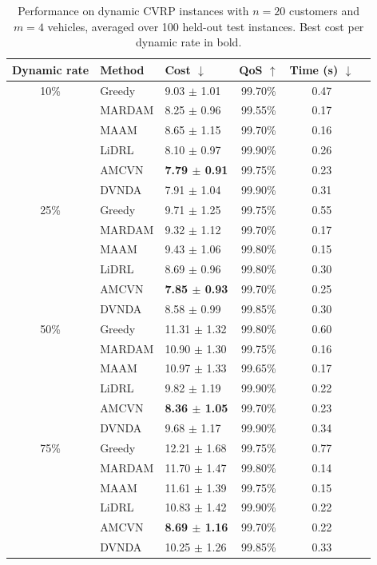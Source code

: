 \begin{table}[t]
\centering
\caption{Performance on dynamic CVRP instances with $n=20$ customers and $m=4$ vehicles, averaged over 100 held-out test instances. Best cost per dynamic rate in bold.}
\label{tab:main_results_n20}
\begin{tabular}{cllccc}
\toprule
Dynamic rate & Method & Cost $\downarrow$ & QoS $\uparrow$ & Time (s) $\downarrow$ \\
\midrule
10\% & Greedy & 9.03 $\pm$ 1.01 & 99.70\% & 0.47 \\
 & MARDAM & 8.25 $\pm$ 0.96 & 99.55\% & 0.17 \\
 & MAAM & 8.65 $\pm$ 1.15 & 99.70\% & 0.16 \\
 & LiDRL & 8.10 $\pm$ 0.97 & 99.90\% & 0.26 \\
 & AMCVN & \textbf{7.79 $\pm$ 0.91} & 99.75\% & 0.23 \\
 & DVNDA & 7.91 $\pm$ 1.04 & 99.90\% & 0.31 \\
\midrule
25\% & Greedy & 9.71 $\pm$ 1.25 & 99.75\% & 0.55 \\
 & MARDAM & 9.32 $\pm$ 1.12 & 99.70\% & 0.17 \\
 & MAAM & 9.43 $\pm$ 1.06 & 99.80\% & 0.15 \\
 & LiDRL & 8.69 $\pm$ 0.96 & 99.80\% & 0.30 \\
 & AMCVN & \textbf{7.85 $\pm$ 0.93} & 99.70\% & 0.25 \\
 & DVNDA & 8.58 $\pm$ 0.99 & 99.85\% & 0.30 \\
\midrule
50\% & Greedy & 11.31 $\pm$ 1.32 & 99.80\% & 0.60 \\
 & MARDAM & 10.90 $\pm$ 1.30 & 99.75\% & 0.16 \\
 & MAAM & 10.97 $\pm$ 1.33 & 99.65\% & 0.17 \\
 & LiDRL & 9.82 $\pm$ 1.19 & 99.90\% & 0.22 \\
 & AMCVN & \textbf{8.36 $\pm$ 1.05} & 99.70\% & 0.23 \\
 & DVNDA & 9.68 $\pm$ 1.17 & 99.90\% & 0.34 \\
\midrule
75\% & Greedy & 12.21 $\pm$ 1.68 & 99.75\% & 0.77 \\
 & MARDAM & 11.70 $\pm$ 1.47 & 99.80\% & 0.14 \\
 & MAAM & 11.61 $\pm$ 1.39 & 99.75\% & 0.15 \\
 & LiDRL & 10.83 $\pm$ 1.42 & 99.90\% & 0.22 \\
 & AMCVN & \textbf{8.69 $\pm$ 1.16} & 99.70\% & 0.22 \\
 & DVNDA & 10.25 $\pm$ 1.26 & 99.85\% & 0.33 \\
\bottomrule
\end{tabular}
\end{table}
